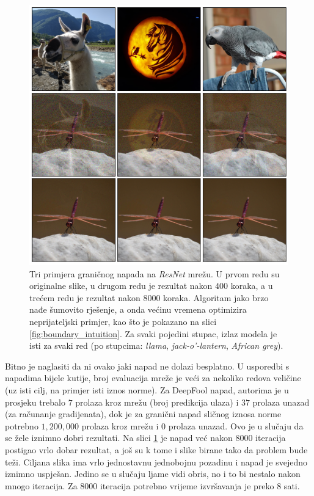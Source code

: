 \documentclass[utf8, diplomski]{fer}
\begin{document}
\begin{figure}[H]
\centering
\includegraphics[width=1.0\textwidth,keepaspectratio]{img/results/boundary_triple.png}
\caption{Tri primjera graničnog napada na \textit{ResNet} mrežu. U prvom redu su originalne slike, u drugom redu je rezultat nakon $400$ koraka, a u trećem redu je rezultat nakon $8000$ koraka. Algoritam jako brzo nađe šumovito rješenje, a onda većinu vremena optimizira neprijateljski primjer, kao što je pokazano na slici \ref{fig:boundary_intuition}. Za svaki pojedini stupac, izlaz modela je isti za svaki red (po stupcima: \textit{llama}, \textit{jack-o'-lantern}, \textit{African grey}).}
\label{fig:boundary_triple}
\end{figure}

Bitno je naglasiti da ni ovako jaki napad ne dolazi besplatno. U usporedbi s napadima bijele kutije, broj evaluacija mreže je veći za nekoliko redova veličine (uz isti cilj, na primjer isti iznos norme). Za DeepFool napad, autorima je u prosjeku trebalo $7$ prolaza kroz mrežu (broj predikcija ulaza) i $37$ prolaza unazad (za računanje gradijenata), dok je za granični napad sličnog iznosa norme potrebno $1,200,000$ prolaza kroz mrežu i $0$ prolaza unazad. Ovo je u slučaju da se žele iznimno dobri rezultati. Na slici \ref{fig:boundary_triple} je napad već nakon $8000$ iteracija postigao vrlo dobar rezultat, a još su k tome i slike birane tako da problem bude teži. Ciljana slika ima vrlo jednostavnu jednobojnu pozadinu i napad je svejedno iznimno uspješan. Jedino se u slučaju ljame vidi obris, no i to bi nestalo nakon mnogo iteracija. Za $8000$ iteracija potrebno vrijeme izvršavanja je preko $8$ sati.
\end{document}
